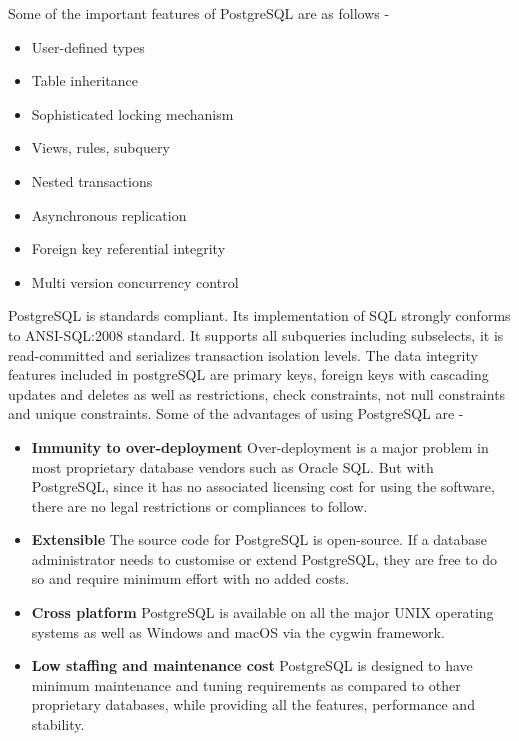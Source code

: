 \documentclass[../thesis.tex]{subfiles}
\begin{document}
Some of the important features of PostgreSQL are as follows -
\smallskip
\begin{itemize}
	\item User-defined types
	\smallskip
	\item Table inheritance
	\smallskip
	\item Sophisticated locking mechanism
	\smallskip
	\item Views, rules, subquery
	\smallskip
	\item Nested transactions
	\smallskip
	\item Asynchronous replication
	\smallskip
	\item Foreign key referential integrity
	\smallskip
	\item Multi version concurrency control	
\end{itemize}
\bigskip
PostgreSQL is standards compliant. Its implementation of SQL strongly conforms to ANSI-SQL:2008 standard. It supports all subqueries including subselects, it is read-committed and serializes transaction isolation levels.
The data integrity features included in postgreSQL are primary keys, foreign keys with cascading updates and deletes as well as restrictions, check constraints, not null constraints and unique constraints.
\bigskip
Some of the advantages of using PostgreSQL are - 
\begin{itemize}
	\item \textbf{Immunity to over-deployment}
	Over-deployment is a major problem in most proprietary database vendors such as Oracle SQL. But with PostgreSQL, since it has no associated licensing cost for using the software, there are no legal restrictions or compliances to follow.
	\smallskip
	\item \textbf{Extensible}
	The source code for PostgreSQL is open-source. If a database administrator needs to customise or extend PostgreSQL, they are free to do so and require minimum effort with no added costs.
	\item \textbf{Cross platform}
	PostgreSQL is available on all the major UNIX operating systems as well as Windows and macOS via the cygwin framework.
	\item \textbf{Low staffing and maintenance cost}
	PostgreSQL is designed to have minimum maintenance and tuning requirements as compared to other proprietary databases, while providing all the features, performance and stability.
\end{itemize}
\end{document}
